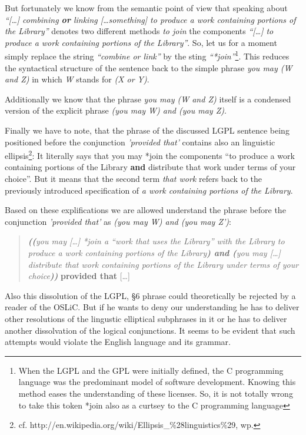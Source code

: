 But fortunately we know from the semantic point of view that speaking about
\emph{\enquote{[\ldots] combining \textbf{or} linking [\ldots something] to
produce a work containing portions of the Library}} denotes two different
methods \emph{to join} the components \emph{\enquote{[\ldots] to produce a work
containing portions of the Library}}. So, let us for a moment simply replace the
string \emph{\enquote{combine or link}} by the sting
\emph{\enquote{*join}}\footnote{When the LGPL and the GPL were initially
defined, the C programming language was the predominant model of software
development. Knowing this method eases the understanding of these licenses. So,
it is not totally wrong to take this token *join also as a curtsey to the C
programming language}. This reduces the syntactical structure of the sentence
back to the simple phrase \emph{you may (W and Z)} in which \emph{W} stands
for \emph{(X or Y)}.

Additionally we know that the phrase \emph{you may (W and Z)} itself is a
condensed version of the explicit phrase \emph{ (you may W) and (you may Z)}.

Finally we have to note, that the phrase of the discussed LGPL sentence being
positioned before the conjunction \emph{'provided that'} contains
also an linguistic ellipsis\footnote{cf.
http://en.wikipedia.org/wiki/Ellipsis\_\%28linguistics\%29, wp.
}: It literally says that you may *join the components \enquote{to produce a
work containing portions of the Library \textbf{and} distribute that work under
terms of your choice}. But it means that the second term \emph{that work} refers
back to the previously introduced specification of \emph{a work containing
portions of the Library}.

Based on these explifications we are allowed understand the phrase before the
conjunction \emph{'provided that'} as \emph{(you may W) and (you may Z')}:

\begin{quote}\noindent\emph{\textbf{((}you may [\ldots] \emph{*join} a
\enquote{work that uses the Library} with the Library to produce a work
containing portions of the Library\textbf{) and (}you may [\ldots] distribute
that work containing portions of the Library under terms of your
choice\textbf{))}} \textbf{provided that} [\ldots]\end{quote}

Also this dissolution of the LGPL, §6 phrase could theoretically be rejected by
a reader of the OSLiC. But if he wants to deny our understanding he has to
deliver other resolutions of the lingustic elliptical subphrases in it or he has
to deliver another dissolvation of the logical conjunctions. It seems to be
evident that such attempts would violate the English language and its grammar.


